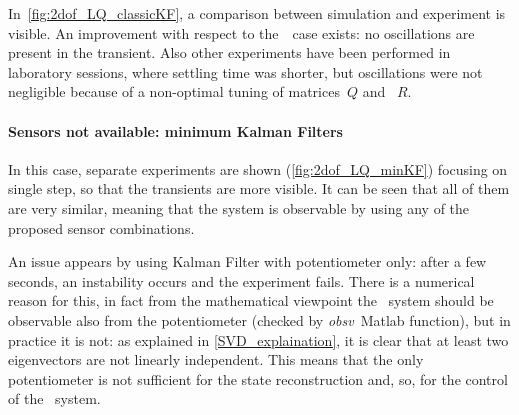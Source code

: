 In~\cref{fig:2dof_LQ_classicKF}, a comparison between simulation and experiment is visible. An improvement with respect to the~\onedof\ case exists: no oscillations are present in the transient. Also other experiments have been performed in laboratory sessions, where settling time was shorter, but oscillations were not negligible because of a non-optimal tuning of matrices~$Q$ and ~$R$.

\paragraph{Sensors not available: minimum Kalman Filters}

In this case, separate experiments are shown (\cref{fig:2dof_LQ_minKF}) focusing on single step, so that the transients are more visible. It can be seen that all of them are very similar, meaning that the system is observable by using any of the proposed sensor combinations.

An issue appears by using Kalman Filter with potentiometer only: after a few seconds, an instability occurs and the experiment fails. There is a numerical reason for this, in fact from the mathematical viewpoint the \twodof~system should be observable also from the potentiometer (checked by \textit{obsv}~Matlab function), but in practice it is not: as explained in \cref{SVD_explaination}, it is clear that at least two eigenvectors are not linearly independent.
This means that the only potentiometer is not sufficient for the state reconstruction and, so, for the control of the \twodof~system.

